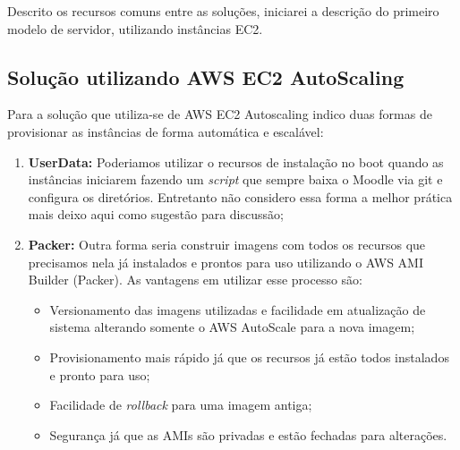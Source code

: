 \documentclass{article}
\begin{document}
Descrito os recursos comuns entre as soluções, iniciarei a descrição do primeiro modelo de servidor, utilizando instâncias EC2.

\subsection{Solução utilizando AWS EC2 AutoScaling}

Para a solução que utiliza-se de AWS EC2 Autoscaling indico duas formas de provisionar as instâncias de forma automática e escalável:

\begin{enumerate}
    \item \textbf{UserData:} Poderiamos utilizar o recursos de instalação no boot quando as instâncias iniciarem fazendo um \textit{script} que sempre baixa o Moodle via git e configura os diretórios. Entretanto não considero essa forma a melhor prática mais deixo aqui como sugestão para discussão;
    \item \textbf{Packer:} Outra forma seria construir imagens com todos os recursos que precisamos nela já instalados e prontos para uso utilizando o AWS AMI Builder (Packer). As vantagens em utilizar esse processo são:
    \begin{itemize}
        \item Versionamento das imagens utilizadas e facilidade em atualização de sistema alterando somente o AWS AutoScale para a nova imagem;
        \item Provisionamento mais rápido já que os recursos já estão todos instalados e pronto para uso;
        \item Facilidade de \textit{rollback} para uma imagem antiga;
        \item Segurança já que as AMIs são privadas e estão fechadas para alterações.
    \end{itemize}
\end{enumerate}
\end{document}
